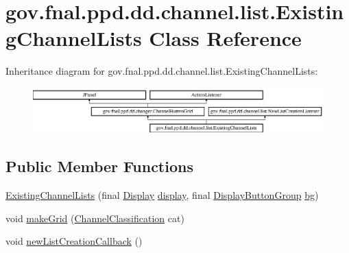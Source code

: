 \hypertarget{classgov_1_1fnal_1_1ppd_1_1dd_1_1channel_1_1list_1_1ExistingChannelLists}{\section{gov.\-fnal.\-ppd.\-dd.\-channel.\-list.\-Existing\-Channel\-Lists Class Reference}
\label{classgov_1_1fnal_1_1ppd_1_1dd_1_1channel_1_1list_1_1ExistingChannelLists}
}
Inheritance diagram for gov.\-fnal.\-ppd.\-dd.\-channel.\-list.\-Existing\-Channel\-Lists\-:\begin{figure}[H]
\begin{center}
\leavevmode
\includegraphics[height=1.761006cm]{classgov_1_1fnal_1_1ppd_1_1dd_1_1channel_1_1list_1_1ExistingChannelLists}
\end{center}
\end{figure}
\subsection*{Public Member Functions}
\begin{DoxyCompactItemize}
\item 
\hyperlink{classgov_1_1fnal_1_1ppd_1_1dd_1_1channel_1_1list_1_1ExistingChannelLists_a70f446df6a0fcf3cea1e0d524aea2192}{Existing\-Channel\-Lists} (final \hyperlink{interfacegov_1_1fnal_1_1ppd_1_1dd_1_1signage_1_1Display}{Display} \hyperlink{classgov_1_1fnal_1_1ppd_1_1dd_1_1changer_1_1ChannelButtonGrid_a3c06b51489dcaacd16f6efcefe06bcaa}{display}, final \hyperlink{classgov_1_1fnal_1_1ppd_1_1dd_1_1util_1_1specific_1_1DisplayButtonGroup}{Display\-Button\-Group} \hyperlink{classgov_1_1fnal_1_1ppd_1_1dd_1_1changer_1_1ChannelButtonGrid_adf258a89161282e5215b4642ecbec812}{bg})
\item 
void \hyperlink{classgov_1_1fnal_1_1ppd_1_1dd_1_1channel_1_1list_1_1ExistingChannelLists_affca544ad4b4775e0b36334e75595c77}{make\-Grid} (\hyperlink{classgov_1_1fnal_1_1ppd_1_1dd_1_1changer_1_1ChannelClassification}{Channel\-Classification} cat)
\item 
void \hyperlink{classgov_1_1fnal_1_1ppd_1_1dd_1_1channel_1_1list_1_1ExistingChannelLists_a1cedfe917a325659dfa082f83c9cef96}{new\-List\-Creation\-Callback} ()
\end{DoxyCompactItemize}

